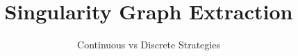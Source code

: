 \documentclass{beamer}
\title{Singularity Graph Extraction}
\author{Continuous vs Discrete Strategies}
\begin{document}
	\frame {
		\titlepage
	}

\end{document}
